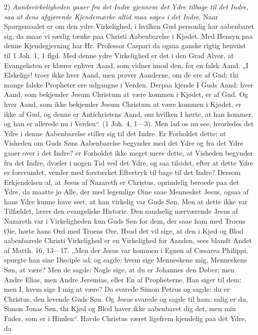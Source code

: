 \documentclass[12pt]{book}
\newcommand{\opage}[1]{\marginnote{\footnotesize\textit{[#1]}}}
\begin{document}
2) \emph{Aandsvirkeligheden gaaer fra det Indre
gjennem det Ydre tilbage til det Indre, saa at dens
afgjørende Kjendemærke altid maa søges i det
Indre}. Naar Spørgsmaalet er om den ydre Virkelighed, i
hvilken Gud personlig har aabenbaret sig, da maae vi særlig
tænke paa Christi Aabenbarelse i Kjødet. Med Hensyn paa
denne Kjendsgjerning har Hr. Professor Caspari da ogsaa
ganske rigtig henviist til 1 Joh. 1, 1 flgd. Med denne ydre
Virkelighed er det i den Grad Alvor, at Evangelisten er\-%
klærer enhver Aand, som vidner imod den, for en falsk
Aand. „I Elskelige! troer ikke hver Aand, men prøver
Aanderne, om de ere af Gud; thi mange falske Propheter
ere udgangne i Verden. Derpaa kjende I Guds Aand: hver
Aand, som bekjender Jesum Christum at være kommen i
Kjødet, er af Gud. Og hver Aand, som ikke bekjender
Jesum Christum at være kommen i Kjødet, er ikke af Gud,
og denne er Antichristens Aand, om hvilken I hørte, at
han kommer, og han er allerede nu i Verden“. (1 Joh. 4,
1---3). Men lad os nu see, hvorledes det Ydre i denne
Aabenbarelse stiller sig til det Indre. Er Forholdet dette:
at Visheden om Guds Søns Aabenbarelse begynder med det
Ydre og fra det Ydre gaaer over i det Indre? er Forholdet
\opage{305}\setcounter{footnote}{0}%
ikke meget mere dette, at Visheden begynder fra det Indre,
dvæler i nogen Tid ved det Ydre, og saa tilsidst, efter at
dette Ydre er forsvundet, vender med forstærket Eftertryk til\-%
bage til det Indre? Dersom Erkjendelsen af, at Jesus af
Nazareth er Christus, oprindelig beroede paa det Ydre, da
maatte jo Alle, der med legemlige Øine saae Mennesket
Jesus, ogsaa af hans Ydre kunne have seet, at han virkelig
var Guds Søn. Men at dette ikke var Tilfældet, lærer den
evangeliske Historie. Den sandselig nærværende Jesus af
Nazareth var i Virkeligheden kun Guds Søn for dem, der
saae ham med Troens Øie, hørte hans Ord med Troens
Øre. Hvad det vil sige, at den i Kjød og Blod aabenbarede
Christi Virkelighed er en Virkelighed for Aanden, sees blandt
Andet af Matth. 16, 13---17. „Men der Jesus var kommen
i Egnen af Cæsarea Philippi, spurgte han sine Disciple ad,
og sagde: hvem sige Menneskene mig, Menneskens Søn, at
være? Men de sagde: Nogle sige, at du er Johannes den
Døber; men Andre Elias, men Andre Jeremias, eller En af
Propheterne. Han siger til dem: men I, hvem sige I mig at
være? Da svarede Simon Petrus og sagde: du er Christus,
den levende Guds Søn. Og Jesus svarede og sagde til ham:
salig er du, Simon Jonas Søn, thi Kjød og Blod haver ikke
aabenbaret dig det, men min Fader, som er i Himlen“.
Havde Christus været ligefrem kjendelig paa det Ydre, da
\end{document}

